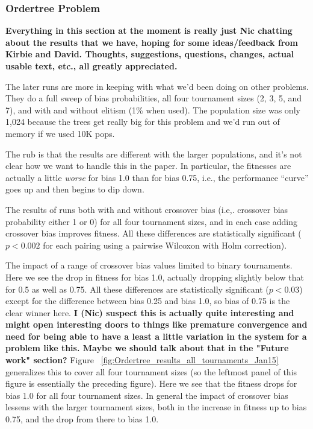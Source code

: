 \documentclass{sig-alternate}
\begin{document}
%
%
%
%

\subsubsection{Ordertree Problem}

\textbf{Everything in this section at the moment is really just Nic chatting about the results that we have, hoping for 
some ideas/feedback from Kirbie and David. Thoughts, suggestions, questions, changes, actual usable text, etc., all 
greatly appreciated.}

The later runs are more in keeping with what we'd been doing on other problems. They do a full sweep of bias 
probabilities, all four tournament sizes (2, 3, 5, and 7), and with and without elitism (1\% when used). The population 
size was only 1,024 because the trees get really big for this problem and we'd run out of memory if we used 10K 
pops.

The rub is that the results are different with the larger populations, and it's not clear how we want to handle this in the 
paper. In particular, the fitnesses are actually a little \emph{worse} for bias 1.0 than for bias 0.75, i.e., the performance 
``curve'' goes up and then begins to dip down.

The results of runs both with and without crossover bias (i.e,. 
crossover bias probability either 1 or 0) for all four tournament sizes, and in each case adding crossover bias 
improves fitness. All these differences are statistically significant ($p < 0.002$ for each pairing using a pairwise 
Wilcoxon with Holm correction).

The impact of a range of crossover bias values 
limited to binary tournaments. Here we see the drop in fitness for bias 1.0, actually dropping slightly below that for 0.5 
as well as 0.75. All these differences are statistically significant ($p < 0.03$) except for the difference between bias 
0.25 and bias 1.0, so bias of 0.75 is the clear winner here. \textbf{I (Nic) suspect this is actually quite interesting and 
might open interesting doors to things like premature convergence and need for being able to have a least a little 
variation in the system for a problem like this. Maybe we should talk about that in the "Future work" section?} Figure~
\ref{fig:Ordertree_results_all_tournaments_Jan15} generalizes this to cover all four tournament sizes (so the leftmost 
panel of this figure is essentially the preceding figure). Here we see that the fitness drops for bias 1.0 for all four 
tournament sizes. In general the impact of crossover bias lessens with the larger tournament sizes, both in the 
increase in fitness up to bias 0.75, and the drop from there to bias 1.0.
\end{document}
